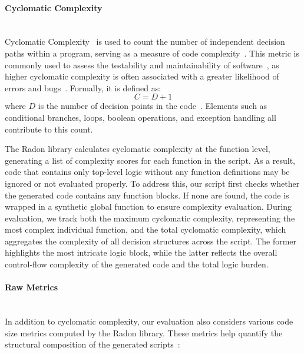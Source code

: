 \documentclass{DESSThesis}
\begin{document}
\paragraph{Cyclomatic Complexity}\mbox{}\\

\noindent Cyclomatic Complexity~\cite{1702388} is used to count the number of independent decision paths within a program, serving as a measure of code complexity~\cite{takerngsaksiri2025codereadabilityagelarge}. This metric is commonly used to assess the testability and maintainability of software~\cite{licorish2025comparinghumanllmgenerated}, as higher cyclomatic complexity is often associated with a greater likelihood of errors and bugs~\cite{10507163}. Formally, it is defined as:
\begin{equation}
        C = D + 1
\end{equation}
where $D$ is the number of decision points in the code~\cite{takerngsaksiri2025codereadabilityagelarge}. Elements such as conditional branches, loops, boolean operations, and exception handling all contribute to this count.

The Radon library calculates cyclomatic complexity at the function level, generating a list of complexity scores for each function in the script. As a result, code that contains only top-level logic without any function definitions may be ignored or not evaluated properly. To address this, our script first checks whether the generated code contains any function blocks. If none are found, the code is wrapped in a synthetic global function to ensure complexity evaluation. During evaluation, we track both the maximum cyclomatic complexity, representing the most complex individual function, and the total cyclomatic complexity, which aggregates the complexity of all decision structures across the script. The former highlights the most intricate logic block, while the latter reflects the overall control-flow complexity of the generated code and the total logic burden.

\paragraph{Raw Metrics}\mbox{}\\

\noindent In addition to cyclomatic complexity, our evaluation also considers various code size metrics computed by the Radon library. These metrics help quantify the structural composition of the generated scripts~\cite{radon}:
\end{document}
